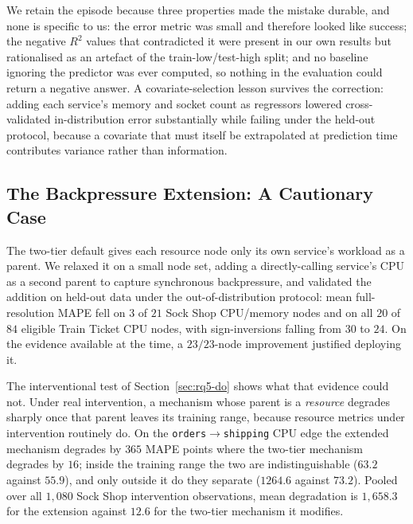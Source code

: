 \documentclass[journal, 10pt]{IEEEtran}
\begin{document}
We retain the episode because three properties made the mistake durable, and none
is specific to us: the error metric was small and therefore looked like success;
the negative $R^2$ values that contradicted it were present in our own results but
rationalised as an artefact of the train-low/test-high split; and no baseline
ignoring the predictor was ever computed, so nothing in the evaluation could
return a negative answer. A covariate-selection lesson survives the correction:
adding each service's memory and socket count as regressors lowered
cross-validated in-distribution error substantially while failing under the
held-out protocol, because a covariate that must itself be extrapolated at
prediction time contributes variance rather than information.


\subsection{The Backpressure Extension: A Cautionary Case}
\label{sec:backpressure-edge}

The two-tier default gives each resource node only its own service's workload as
a parent. We relaxed it on a small node set, adding a directly-calling service's
CPU as a second parent to capture synchronous backpressure, and validated the
addition on held-out data under the out-of-distribution protocol: mean
full-resolution MAPE fell on $3$ of $21$ Sock Shop CPU/memory nodes and on all
$20$ of $84$ eligible Train Ticket CPU nodes, with sign-inversions falling from
$30$ to $24$. On the evidence available at the time, a $23/23$-node improvement
justified deploying it.

The interventional test of Section~\ref{sec:rq5-do} shows what that evidence
could not. Under real intervention, a mechanism whose parent is a \emph{resource}
degrades sharply once that parent leaves its training range, because resource
metrics under intervention routinely do. On the
\texttt{orders}$\to$\texttt{shipping} CPU edge the extended mechanism degrades by
$365$ MAPE points where the two-tier mechanism degrades by $16$; inside the
training range the two are indistinguishable ($63.2$ against $55.9$), and only
outside it do they separate ($1264.6$ against $73.2$). Pooled over all $1{,}080$
Sock Shop intervention observations, mean degradation is $1{,}658.3$ for the
extension against $12.6$ for the two-tier mechanism it modifies.
\end{document}
